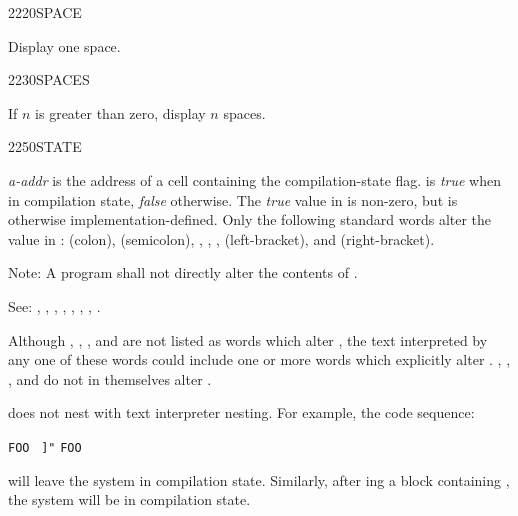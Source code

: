 \begin{newword}{2220}{SPACE}
	\stack{}{}

	Display one space.
\end{newword}


\begin{newword}{2230}{SPACES}

	If $n$ is greater than zero, display $n$ spaces.
\end{newword}


\begin{newword}{2250}{STATE}

	\emph{a-addr} is the address of a cell containing the
	compilation-state flag.  is \emph{true} when in
	compilation state, \emph{false} otherwise. The \emph{true} value
	in  is non-zero, but is otherwise
	implementation-defined. Only the following standard words alter
	the value in :
	\word{:} (colon),
	\word{;} (semicolon),
	,
	,
	,
	\word{[} (left-bracket), and
	\word{]} (right-bracket).

\item[Note:]
	A program shall not directly alter the contents of .

\item[See:]
	,
	,
	,
	,
	\wref{core:[}{[},
	\wref{core:]}{]},
	,
	.

	\begin{rationale} %
		Although
		,
		,
		, and
		are not listed as words which alter , the text
		interpreted by any one of these words could include one or
		more words which explicitly alter .
		,
		,
		, and
		do not in themselves alter .

		 does not nest with text interpreter nesting. For
		example, the code sequence:

		\tab \word{:} \texttt{FOO}~
			 \texttt{]"} 
		\word{;}
		\qquad
		\texttt{FOO}

		will leave the system in compilation state. Similarly, after
		ing a block containing \word{]}, the system
		will be in compilation state.


\end{rationale}
\end{newword}

